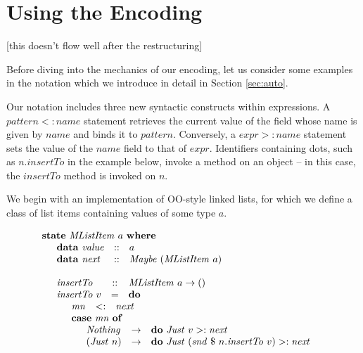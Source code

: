 \documentclass[runningheads,a4paper]{llncs}
\newcommand{\todo}[1]{[{\color{blue}#1}]}
\begin{document}
\section{Using the Encoding}
\label{sec:usage}

\todo{this doesn't flow well after the restructuring}

Before diving into the mechanics of our encoding, let us consider some examples in the notation which we introduce in detail in Section \ref{sec:auto}. 

Our notation includes three new syntactic constructs within expressions. A $\mathit{pattern} <: \mathit{name}$ statement retrieves the current value of the field whose name is given by $\mathit{name}$ and binds it to $\mathit{pattern}$. Conversely, a $\mathit{expr} >: \mathit{name}$ statement sets the value of the $\mathit{name}$ field to that of $\mathit{expr}$. Identifiers containing dots, such as $n.\mathit{insertTo}$ in the example below, invoke a method on an object -- in this case, the $\mathit{insertTo}$ method is invoked on $n$.

We begin with an implementation of OO-style linked lists, for which we define a class of list items containing values of some type $a$.

\begin{displaymath}
\begin{array}{l}
\mathbf{state}~\mathit{MListItem}~a~\mathbf{where} \\
\quad \begin{array}{lcl}
\mathbf{data}~\mathit{value} & :: & a \\
\mathbf{data}~\mathit{next}  & :: & \mathit{Maybe}~(\mathit{MListItem}~a)
\end{array}\\\\
\quad \begin{array}{lcl}
\mathit{insertTo} & :: & \mathit{MListItem}~a \to ()\\
\mathit{insertTo}~v & = & \mathbf{do} \\
\multicolumn{3}{l}{\quad \begin{array}{lcl}
\mathit{mn} & <: & \mathit{next} \\
\multicolumn{3}{l}{\mathbf{case}~\mathit{mn}~\mathbf{of}} \\
\multicolumn{3}{l}{\quad \begin{array}{lcl}
\mathit{Nothing} & \to & \mathbf{do}~\mathit{Just}~v >: \mathit{next} \\
(\mathit{Just}~n) & \to & \mathbf{do}~\mathit{Just}~(\mathit{snd}~\$~n.\mathit{insertTo}~v) >: \mathit{next}
\end{array}}
\end{array}}
\end{array}
\end{array}
\end{displaymath}
\end{document}
